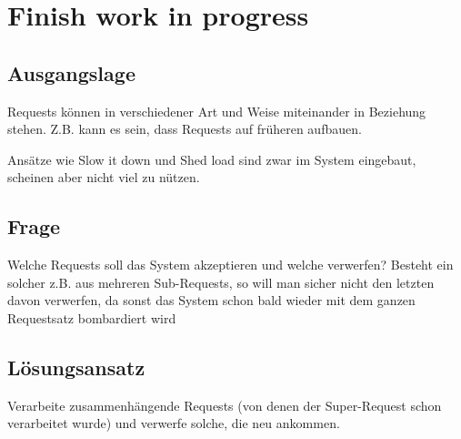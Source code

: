 \section{Finish work in progress}

\subsection{Ausgangslage}


Requests können in verschiedener Art und Weise miteinander in Beziehung stehen. Z.B. kann es sein, dass Requests auf früheren aufbauen.

Ansätze wie Slow it down und Shed load sind zwar im System eingebaut, scheinen aber nicht viel zu nützen.

\subsection{Frage}


Welche Requests soll das System akzeptieren und welche verwerfen?
Besteht ein solcher z.B. aus mehreren Sub-Requests, so will man sicher nicht den letzten davon verwerfen, da sonst das System schon bald wieder mit dem ganzen Requestsatz bombardiert wird

\subsection{Lösungsansatz}


Verarbeite zusammenhängende Requests (von denen der Super-Request schon verarbeitet wurde) und verwerfe solche, die neu ankommen.
